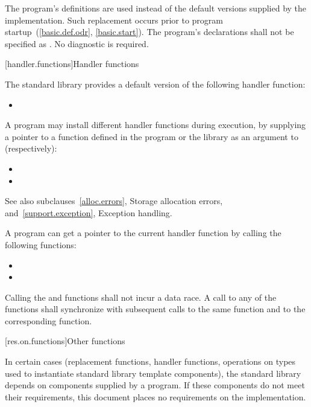 \pnum
The program's definitions are used instead of the default versions supplied by
the implementation.
Such replacement occurs prior to program startup~(\ref{basic.def.odr}, \ref{basic.start}).
%
The program's declarations shall not be specified as
.
No diagnostic is required.

[handler.functions]{Handler functions}

\pnum
The \Cpp{} standard library provides a default version of the following handler
function:
\begin{itemize}
\item
{}
%
\end{itemize}

\pnum
A \Cpp{} program may install different handler functions during execution, by
supplying a pointer to a function defined in the program or the library
as an argument to (respectively):
\begin{itemize}
\item {}
\item {}
\end{itemize}
See also subclauses~\ref{alloc.errors}, Storage allocation errors, and~\ref{support.exception},
Exception handling.

\pnum
A \Cpp{} program can get a pointer to the current handler function by calling the following
functions:
\begin{itemize}
\item
{}%
\item
{}
\end{itemize}

\pnum
Calling the  and  functions shall not incur a data race. A call to
any of the  functions shall synchronize with subsequent calls to the same
 function and to the corresponding  function.

[res.on.functions]{Other functions}

\pnum
In certain cases (replacement functions, handler functions, operations on types used to
instantiate standard library template components), the \Cpp{} standard library depends on
components supplied by a \Cpp{} program.
If these components do not meet their requirements, this document places no requirements
on the implementation.

